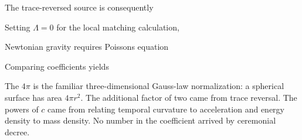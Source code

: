 \documentclass[
  11pt,
  letterpaper,
  oneside,
  openany]{scrbook}
\begin{document}
\begin{center}
\begingroup
{}
\ifdim\wd\grmathbox>\linewidth
\resizebox{\linewidth}{!}{\usebox{\grmathbox}}
\else\usebox{\grmathbox}\fi
\endgroup
\end{center}

The trace-reversed source is consequently

\begin{center}
\begingroup
{}
\ifdim\wd\grmathbox>\linewidth
\resizebox{\linewidth}{!}{\usebox{\grmathbox}}
\else\usebox{\grmathbox}\fi
\endgroup
\end{center}

Setting \(\Lambda=0\) for the local matching calculation,

\begin{center}
\begingroup
{}
\ifdim\wd\grmathbox>\linewidth
\resizebox{\linewidth}{!}{\usebox{\grmathbox}}
\else\usebox{\grmathbox}\fi
\endgroup
\end{center}

Newtonian gravity requires Poisson\textquotesingle s equation

\begin{center}
\begingroup
{}
\ifdim\wd\grmathbox>\linewidth
\resizebox{\linewidth}{!}{\usebox{\grmathbox}}
\else\usebox{\grmathbox}\fi
\endgroup
\end{center}

Comparing coefficients yields

\begin{center}
\begingroup
{}
\ifdim\wd\grmathbox>\linewidth
\resizebox{\linewidth}{!}{\usebox{\grmathbox}}
\else\usebox{\grmathbox}\fi
\endgroup
\end{center}

The \(4\pi\) is the familiar three-dimensional Gauss-law normalization:
a spherical surface has area \(4\pi r^2\). The additional factor of two
came from trace reversal. The powers of \(c\) came from relating
temporal curvature to acceleration and energy density to mass density.
No number in the coefficient arrived by ceremonial decree.
\end{document}
